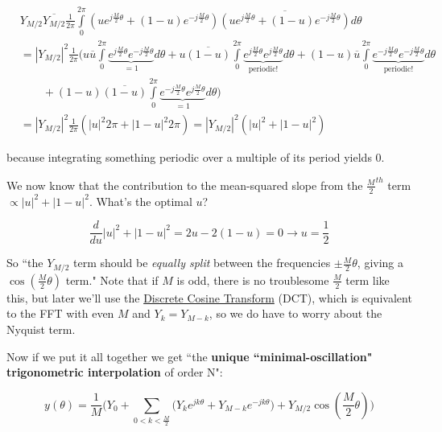 \documentclass[10pt]{article}
\begin{document}
\begin{align*}
& Y_{M/2}\overline{Y_{M/2}}\frac{1}{2\pi} \int\limits_{0}^{2\pi} (ue^{j\frac{M}{2}\theta} + (1 - u)e^{-j\frac{M}{2}\theta}) \overline{(ue^{j\frac{M}{2}\theta} + (1 - u)e^{-j\frac{M}{2}\theta})} d\theta \\
&= |Y_{M/2}|^2 \frac{1}{2\pi} \Big(u\overline{u} \int\limits_{0}^{2\pi} \underbrace{e^{j\frac{M}{2}\theta} e^{-j\frac{M}{2}\theta}}_{= 1} d\theta + u \overline{(1 - u)} \int\limits_{0}^{2\pi} \underbrace{e^{j\frac{M}{2}\theta} e^{j\frac{M}{2}\theta}}_{\text{periodic!}} d\theta + (1 - u)\overline{u} \int\limits_{0}^{2\pi} \underbrace{e^{-j\frac{M}{2}\theta} e^{-j\frac{M}{2}\theta}}_{\text{periodic!}} d\theta \\
& \quad \quad + (1 - u) \overline{(1 - u)} \int\limits_{0}^{2\pi} \underbrace{e^{-j\frac{M}{2}\theta} e^{j\frac{M}{2}\theta}}_{= 1} d\theta \Big) \\
&= |Y_{M/2}|^2 \frac{1}{2\pi} (|u|^2 2\pi + |1 - u|^2 2\pi) = |Y_{M/2}|^2 (|u|^2 + |1 - u|^2)
\end{align*}

because integrating something periodic over a multiple of its period yields 0.\newline

We now know that the contribution to the mean-squared slope from the $\frac{M}{2}^{th}$ term $\propto |u|^2 + |1 - u|^2$. What's the optimal $u$?

$$\frac{d}{du} |u|^2 + |1 - u|^2 = 2u - 2(1-u) = 0 \longrightarrow u = \frac{1}{2}$$

So ``the $Y_{M/2}$ term should be \textit{equally split} between the frequencies $\pm\frac{M}{2}\theta$, giving a $\cos(\frac{M}{2}\theta)$ term." Note that if $M$ is odd, there is no troublesome $\frac{M}{2}$ term like this, but later we'll use the \href{https://docs.scipy.org/doc/scipy/reference/generated/scipy.fft.dct.html}{Discrete Cosine Transform}\cite{dct} (DCT), which is equivalent to the FFT with even $M$ and $Y_k = Y_{M-k}$, so we do have to worry about the Nyquist term.

Now if we put it all together we get ``the \textbf{unique ``minimal-oscillation" trigonometric interpolation} of order N":

\begin{equation}\label{interpolant}
y(\theta) = \frac{1}{M} \Big(Y_0 + \sum_{0 < k < \frac{M}{2}} \big(Y_k e^{j k \theta} + Y_{M-k} e^{-j k \theta}\big) + Y_{M/2}\cos(\frac{M}{2}\theta) \Big)
\end{equation}
\end{document}
